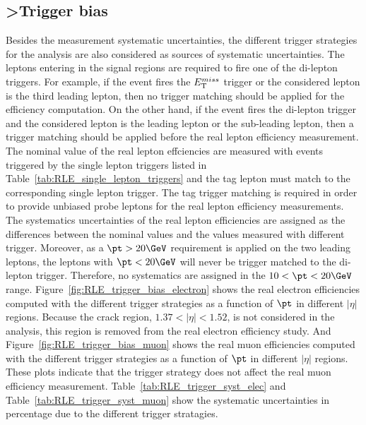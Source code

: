 \subsection{>Trigger bias}
\label{subsubsec:RLE_trigger_bias}

Besides the measurement systematic uncertainties, the different trigger strategies for the analysis are also considered as sources of systematic uncertainties.
The leptons entering in the signal regions are required to fire one of the di-lepton triggers.
For example, if the event fires the $E_{\text T}^{miss}$ trigger or the considered lepton is the third leading lepton, then no trigger matching should be applied for the efficiency computation.
On the other hand, if the event fires the di-lepton trigger and the considered lepton is the leading lepton or the sub-leading lepton, then a trigger matching should be applied before the real lepton efficiency measurement.
The nominal value of the real lepton effciencies are measured with events triggered by the single lepton triggers listed in Table~\ref{tab:RLE_single_lepton_triggers} and the tag lepton must match to the corresponding single lepton trigger.
The tag trigger matching is required in order to provide unbiased probe leptons for the real lepton efficiency measurements.
The systematics uncertainties of the real lepton efficiencies are assigned as the differences between the nominal values and the values measured with different trigger.
Moreover, as a $\pt>20 \GeV$ requirement is applied on the two leading leptons, the leptons with $\pt<20 \GeV$ will never be trigger matched to the di-lepton trigger.
Therefore, no systematics are assigned in the $10<\pt<20 \GeV$ range.
Figure~\ref{fig:RLE_trigger_bias_electron} shows the real electron efficiencies computed with the different trigger strategies as a function of $\pt$ in different $|\eta|$ regions.
Because the crack region, $1.37<|\eta|<1.52$, is not considered in the analysis, this region is removed from the real electron efficiency study.
And Figure~\ref{fig:RLE_trigger_bias_muon} shows the real muon efficiencies computed with the different trigger strategies as a function of $\pt$ in different $|\eta|$ regions.
These plots indicate that the trigger strategy does not affect the real muon efficiency measurement.
Table~\ref{tab:RLE_trigger_syst_elec} and Table~\ref{tab:RLE_trigger_syst_muon} show the systematic uncertainties in percentage due to the different trigger stratagies.

